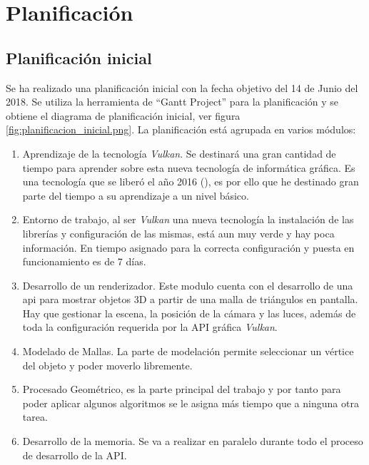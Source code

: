 \chapter{Planificación}

\section{ Planificación inicial}
Se ha realizado una planificación inicial con la fecha objetivo del 14 de Junio del 2018. Se utiliza la herramienta de ``Gantt Project'' para la planificación y se obtiene el diagrama de planificación inicial, ver figura \ref{fig:planificacion_inicial.png}. La planificación está agrupada en varios módulos:\\

\begin{enumerate}
	\item Aprendizaje de la tecnología \textit{Vulkan}. Se destinará una gran cantidad de tiempo para aprender sobre esta nueva tecnología de informática gráfica. Es una tecnología que se liberó el año 2016 (\cite{KhronosReleasesVulkan2016}), es por ello que he destinado gran parte del tiempo a su aprendizaje a un nivel básico.
	
	\item Entorno de trabajo, al ser \textit{Vulkan} una nueva tecnología la instalación de las librerías y configuración de las mismas, está aun muy verde y hay poca información. En tiempo asignado para la correcta configuración y puesta en funcionamiento es de 7 días.
	
	\item Desarrollo de un renderizador. Este modulo cuenta con el desarrollo de una api para mostrar objetos 3D a partir de una malla de triángulos en pantalla. Hay que gestionar la escena, la posición de la cámara y las luces, además de toda la configuración requerida por la API gráfica \textit{Vulkan}. 
	
	\item Modelado de Mallas. La parte de modelación permite seleccionar un vértice del objeto y poder moverlo libremente.
	\item Procesado Geométrico, es la parte principal del trabajo y por tanto para poder aplicar algunos algoritmos se le asigna más tiempo que a ninguna otra tarea.
	
	\item Desarrollo de la memoria. Se va a realizar en paralelo durante todo el proceso de desarrollo de la API.
\end{enumerate}

